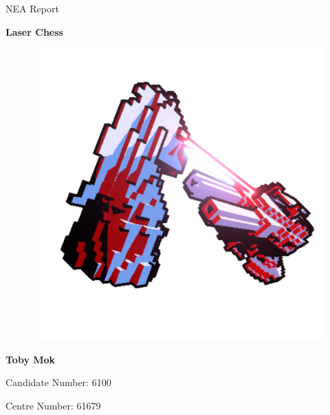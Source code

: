 \documentclass{report}
\begin{document}
\pagestyle{fancy}

\fancyhead[L]{\leftmark}
\fancyhead[R]{\rightmark}

\fancyfoot[C]{\thepage}

\begin{titlepage}
\begin{center}
\vspace*{1cm}

\LARGE
NEA Report

\vspace*{0.5cm}
{\fontsize{40}{50}\selectfont \textbf{Laser Chess}}

\vspace*{1.0cm}

\begin{figure}[H]
    \centering
    \includegraphics[width=0.9\columnwidth]{../main/assets/title_page_art.png}
\end{figure}

\vfill

\normalsize
\textbf{Toby Mok}

Candidate Number: 6100

Centre Number: 61679

\end{center}
\end{titlepage}

\newpage
\tableofcontents










\appendix


\end{document}
